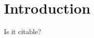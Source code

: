 \documentclass[./mainBiblatex]{subfiles}
\begin{document}
\section{Introduction}
Is it citable? \autocite{Haxby2425}

\end{document}
